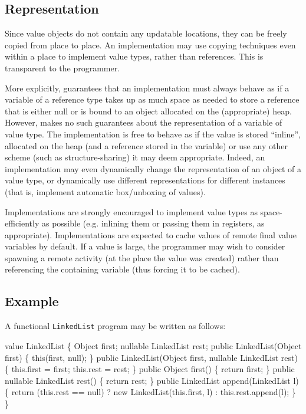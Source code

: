 \subsection{Representation}

Since value objects do not contain any updatable locations, they can
be freely copied from place to place. An implementation may use
copying techniques even within a place to implement value types,
rather than references. This is transparent to the programmer.

More explicitly, \Xten{} guarantees that an implementation must always
behave as if a variable of a reference type takes up as much space as
needed to store a reference that is either null or is bound to an
object allocated on the (appropriate) heap. However, \Xten{} makes no
such guarantees about the representation of a variable of value
type. The implementation is free to behave as if the value is stored
``inline'', allocated on the heap (and a reference stored in the
variable) or use any other scheme (such as structure-sharing) it may
deem appropriate. Indeed, an implementation may even dynamically
change the representation of an object of a value type, or dynamically
use different representations for different instances (that is,
implement automatic box/unboxing of values).

Implementations are strongly encouraged to implement value types as
space-efficiently as possible (e.g.{} inlining them or passing them in
registers, as appropriate).  Implementations are expected to cache
values of remote final value variables by default. If a value is
large, the programmer may wish to consider spawning a remote activity
(at the place the value was created) rather than referencing the
containing variable (thus forcing it to be cached).


\subsection{Example}
\cbstart

A functional {\tt LinkedList} program may be written as follows:

\cbend

\begin{x10}
value LinkedList  \{ 
  Object first;
  nullable LinkedList rest;
  public
     LinkedList(Object first) \{
     this(first, null);
  \}
  public
    LinkedList(Object first,  
               nullable LinkedList rest) \{
    this.first = first;
    this.rest = rest;
  \}
  public 
    Object first() \{
    return first;
  \}
  public 
    nullable LinkedList rest() \{
    return rest;
  \} 
  public
    LinkedList append(LinkedList l) \{
    return (this.rest == null) 
        ? new LinkedList(this.first, l) 
        : this.rest.append(l);
  \}
\}
\end{x10}


